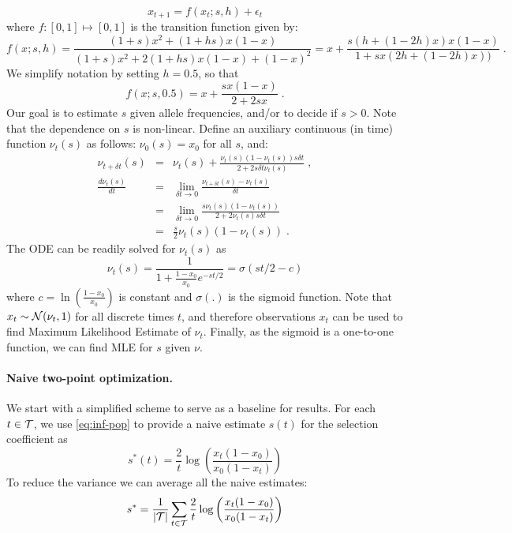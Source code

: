 \begin{equation}
x_{t+1} = f(x_t;s,h) + \epsilon_t
\label{eq:trans0} 
\end{equation}
where $f: [0,1] \mapsto [0,1]$ is the
transition function given by:
\begin{equation}
f(x;s,h)=\frac{(1+s)x^2 + (1+hs)x(1-x)}{(1+s)x^2 + 2(1+hs)x(1-x) + (1-x)^2}
    =x+\frac{s(h+(1-2h)x)x(1-x)}{1+sx(2h+(1-2h)x))}\;.
\end{equation}
We simplify notation by setting $h=0.5$, so that
\begin{equation}
  f(x;s,0.5)=x+\frac{sx(1-x)}{2+2sx}\;.
  \label{eq:hequalshalf}
\end{equation}
Our goal is to estimate $s$ given allele frequencies, and/or to decide
if $s>0$. Note that the dependence on $s$ is non-linear. Define an
auxiliary continuous (in time) function $\nu_t(s)$ as follows:
$\nu_0(s)=x_0$ for all $s$, and:
\begin{eqnarray}
  \nu_{t+\delta t}(s) &=& \nu_t(s)+\frac{\nu_t(s)(1-\nu_t(s))s\delta t}{2+2s\delta t \nu_t(s)}\;,\\
  \frac{d\nu_t(s)}{dt} &=&\lim_{\delta t\rightarrow 0}\frac{\nu_{t+\delta t}(s) -\nu_t(s)}{\delta t}\\
   &=&\lim_{\delta t\rightarrow 0}\frac{s\nu_t(s)(1-\nu_t(s))}{2+2\nu_t(s)s\delta t}\\
   &=& \frac{s}{2}\nu_t(s)(1-\nu_t(s)) \;.
  \label{eq:ode}
\end{eqnarray}
The ODE can be readily solved for $\nu_t(s)$ as
\begin{equation}
  \nu_t(s) =\frac{1}{1+\frac{1-x_0}{x_0}e^{-st/2}} = \sigma(st/2-c) 
  \label{eq:inf-pop}
\end{equation}
where $c=\ln\left(\frac{1-x_0}{x_0}\right)$ is
constant\cite{Stephan2006} and $\sigma(.)$ is the sigmoid
function. Note that $x_t\sim{\cal N}(\nu_t,1)$ for all discrete times $t$,
and therefore observations $x_t$ can be used to find Maximum
Likelihood Estimate of $\nu_t$. Finally, as the sigmoid is a
one-to-one function, we can find MLE for $s$ given {\bf $\nu$}.

\paragraph{Naive two-point optimization.} We start with a simplified
scheme to serve as a baseline for results.  For each $t\in {\cal T}$, we
use \eqref{eq:inf-pop} to provide a naive estimate $s(t)$ for the
selection coefficient as
\begin{equation}
  s^*(t)=\frac{2}{t} \log \left( \frac{x_t(1-x_0)}{x_0 (1-x_t)} \right) 
  \label{eq:naive2point}
\end{equation}
To reduce the variance we can average all the naive estimates: 
\begin{equation}
  s^*=\frac{1}{|{\cal T}|}\sum_{t\in {\cal T}}\frac{2}{t} \log \left( \frac{x_t
      (1-x_0)}{x_0 (1-x_t)} \right) 
  \label{eq:naive}
\end{equation}


